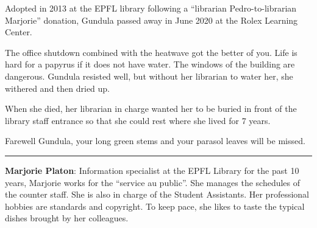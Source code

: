 \documentclass[a4paper,
fontsize=11pt,
oneside,
numbers=noperiodatend,
parskip=half-,
bibliography=totoc,
final
]{scrartcl}
\begin{document}


Adopted in 2013 at the EPFL library following a \enquote{librarian
Pedro-to-librarian Marjorie} donation, Gundula passed away in June 2020
at the Rolex Learning Center.

The office shutdown combined with the heatwave got the better of you.
Life is hard for a papyrus if it does not have water. The windows of the
building are dangerous. Gundula resisted well, but without her librarian
to water her, she withered and then dried up.

When she died, her librarian in charge wanted her to be buried in front
of the library staff entrance so that she could rest where she lived for
7 years.

Farewell Gundula, your long green stems and your parasol leaves will be
missed.

\begin{center}\rule{0.5\linewidth}{0.5pt}\end{center}

\textbf{Marjorie Platon}: Information specialist at the EPFL Library for
the past 10 years, Marjorie works for the ``service au public''. She
manages the schedules of the counter staff. She is also in charge of the
Student Assistants. Her professional hobbies are standards and
copyright. To keep pace, she likes to taste the typical dishes brought
by her colleagues.
\end{document}

